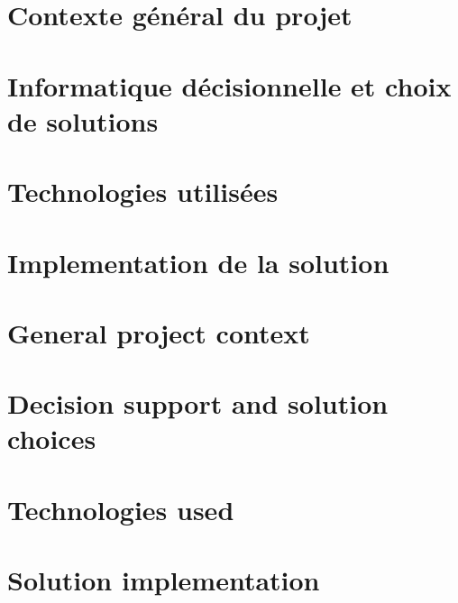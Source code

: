 \documentclass{iid}
\begin{document}


\setcounter{page}{1}
\ifnum{}
    
\else
    
\fi
\ifnum{}
\else
\fi
\fancyhead[L]{\tiny \leftmark}
\fancyhead[R]{\scriptsize \rightmark}
\fancyfoot[C]{\thepage}


\ifnum{}
    \chapter{Contexte général du projet}\label{chap:1}
    \minitoc
    
    \chapter{Informatique décisionnelle et choix de solutions}\label{chap:2}
    

    \chapter{Technologies utilisées}\label{chap:3}
    

    \chapter{Implementation de la solution}\label{chap:4}
    

\else
    \chapter{General project context}\label{chap:1}
    

    \chapter{Decision support and solution choices}\label{chap:2}
    

    \chapter{Technologies used}\label{chap:3}
    

    \chapter{Solution implementation}\label{chap:4}
    
\fi
 
% 
\ifnum{}
    
\else
    
\fi
% 
\lhead[]{} \rhead[]{} \chead[]{}




%
\end{document}
